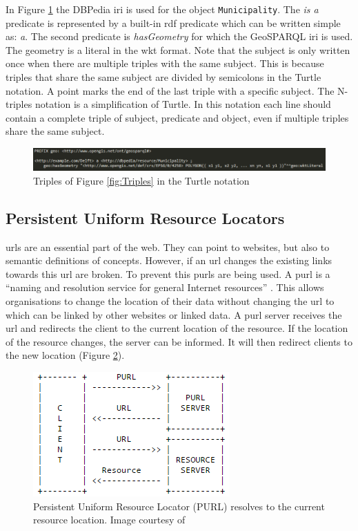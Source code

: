 In Figure \ref{fig:Turtle} the DBPedia \ac{iri} is used for the object \texttt{Municipality}. The \textit{is a} predicate is represented by a built-in \ac{rdf} predicate which can be written simple as: \textit{a}. The second predicate is \textit{hasGeometry} for which the GeoSPARQL \ac{iri} is used. The geometry is a literal in the \ac{wkt} format. Note that the subject is only written once when there are multiple triples with the same subject. This is because triples that share the same subject are divided by semicolons in the Turtle notation. A point marks the end of the last triple with a specific subject. The N-triples notation is a simplification of Turtle. In this notation each line should contain a complete triple of subject, predicate and object, even if multiple triples share the same subject. 

\begin{figure}
	\centering
	\includegraphics[width=1\linewidth]{figs/Turtle.png}
	\caption{Triples of Figure \ref{fig:Triples} in the Turtle notation}
	\label{fig:Turtle}
\end{figure} 

\subsection{Persistent Uniform Resource Locators}
\label{par:purl}
\acp{url} are an essential part of the web. They can point to websites, but also to semantic definitions of concepts. However, if an \ac{url} changes the existing links towards this \ac{url} are broken. To prevent this \aclp{purl} are being used. A \acf{purl} is a \enquote{naming and resolution service for general Internet resources} \citep{LD:PURL}. This allows organisations to change the location of their data without changing the \ac{url} to which can be linked by other websites or linked data. A \ac{purl} server receives the \ac{url} and redirects the client to the current location of the resource. If the location of the resource 
changes, the server can be informed. It will then redirect clients to the new location (Figure \ref{fig:PURL}).  

\begin{figure}
	\centering
	\includegraphics[width=0.6\linewidth]{figs/purl.png}
	\caption{Persistent Uniform Resource Locator (PURL) resolves to the current resource location. Image courtesy of \cite{LD:PURL}}
	\label{fig:PURL}
\end{figure} 


